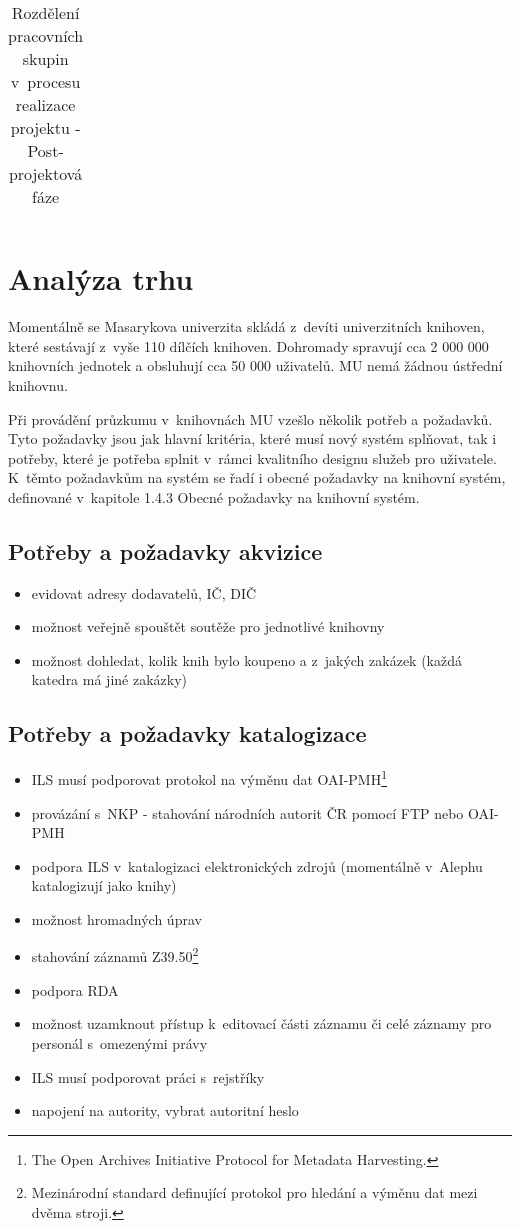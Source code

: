 \documentclass[
	11pt, oneside, printed, draft, 
	table,   %
	lof,     %
	lot     %
]{fithesis3}
\begin{document}
{\begin{table}
\begin{tabular}{| p{3cm} | p{8.3cm} |}
    \end{tabular}
    \caption{Rozdělení pracovních skupin v~procesu realizace projektu - Post-projektová fáze}
\end{table}

\section{Analýza trhu}
Momentálně se Masarykova univerzita skládá z~devíti univerzitních knihoven, které sestávají z~vyše 110 dílčích knihoven. Dohromady spravují cca 2 000 000 knihovních jednotek a obsluhují cca 50 000 uživatelů. MU nemá žádnou ústřední knihovnu.

Při provádění průzkumu v~knihovnách MU vzešlo několik potřeb a požadavků. Tyto požadavky jsou jak hlavní kritéria, které musí nový systém splňovat, tak i potřeby, které je potřeba splnit v~rámci kvalitního designu služeb pro uživatele. K~těmto požadavkům na systém se řadí i obecné požadavky na knihovní systém, definované v~kapitole 1.4.3 Obecné požadavky na knihovní systém. %

\subsection{Potřeby a požadavky akvizice}

\begin{itemize}
\item evidovat adresy dodavatelů, IČ, DIČ
\item možnost veřejně spouštět soutěže pro jednotlivé knihovny
\item možnost dohledat, kolik knih bylo koupeno a z~jakých zakázek (každá katedra má jiné zakázky)
\end{itemize}

\subsection{Potřeby a požadavky katalogizace}

\begin{itemize}
\item ILS musí podporovat protokol na výměnu dat OAI-PMH\footnote{The Open Archives Initiative Protocol for Metadata Harvesting.}
\item provázání s~NKP - stahování národních autorit ČR pomocí FTP nebo OAI-PMH
\item podpora ILS v~katalogizaci elektronických zdrojů (momentálně v~Alephu katalogizují jako knihy)
\item možnost hromadných úprav
\item stahování záznamů Z39.50\footnote{Mezinárodní standard definující protokol pro hledání a výměnu dat mezi dvěma stroji.}
\item podpora RDA
\item možnost uzamknout přístup k~editovací části záznamu či celé záznamy pro personál s~omezenými právy
\item ILS musí podporovat práci s~rejstříky
\item napojení na autority, vybrat autoritní heslo
\end{itemize}

}
\end{document}
